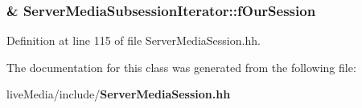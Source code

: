 \subsubsection[{f\+Our\+Session}]{\& Server\+Media\+Subsession\+Iterator\+::f\+Our\+Session\hspace{0.3cm}{\ttfamily [private]}}\label{classServerMediaSubsessionIterator_accd72b45f330afe23477e935fbabedcf}


Definition at line 115 of file Server\+Media\+Session.\+hh.



The documentation for this class was generated from the following file\+:\begin{DoxyCompactItemize}
\item 
live\+Media/include/{\bf Server\+Media\+Session.\+hh}\end{DoxyCompactItemize}

